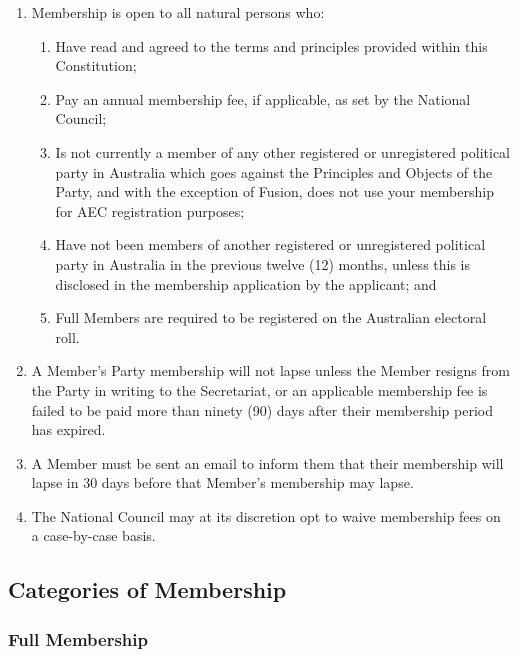 \documentclass[a4paper,titlepage,8.5pt]{article}
\begin{document}
\begin{enumerate}
\item Membership is open to all natural persons who:
\begin{enumerate}
\item Have read and agreed to the terms and principles provided within this Constitution;
\item Pay an annual membership fee, if applicable, as set by the National Council;
\item Is not currently a member of any other registered or unregistered political party in Australia which goes against the Principles and Objects of the Party, and with the exception of Fusion, does not use your membership for AEC registration purposes;
\item Have not been members of another registered or unregistered political party in Australia in the previous twelve (12) months, unless this is disclosed in the membership application by the applicant; and
\item Full Members are required to be registered on the Australian electoral roll.
\end{enumerate}
\item A Member’s Party membership will not lapse unless the Member resigns from the Party in writing to the Secretariat, or an applicable membership fee is failed to be paid more than ninety (90) days after their membership period has expired.
\item A Member must be sent an email to inform them that their membership will lapse in 30 days before that Member's membership may lapse.
\item The National Council may at its discretion opt to waive membership fees on a case-by-case basis.
\end{enumerate}

\subsection{Categories of Membership}

\subsubsection{Full Membership}
\end{document}
